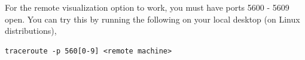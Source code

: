 \documentclass[12pt]{article}
\begin{document}




\begin{figure}[h]
  \centering
  \vspace{5pt}
  \hspace{20pt}
  \caption{}
  \vspace{-10pt}
  \label{}
\end{figure}


For the remote visualization option to work, you must have ports 5600
- 5609 open. You can try this by running the following on your local
desktop (on Linux distributions),

\begin{verbatim}
traceroute -p 560[0-9] <remote machine>
\end{verbatim}

\end{document}
